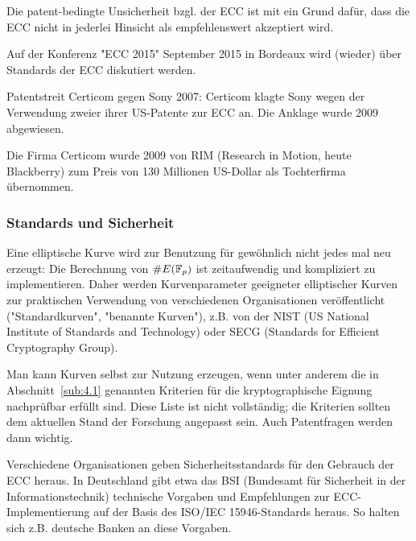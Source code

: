 \begin{bem}
	Die patent-bedingte Unsicherheit bzgl. der ECC ist mit ein Grund dafür, dass die ECC nicht in jederlei Hinsicht als empfehlenswert akzeptiert wird.
\end{bem}

\begin{bem}
	Auf der Konferenz "ECC 2015" September 2015 in Bordeaux wird (wieder) über Standards der ECC diskutiert werden.
\end{bem}

\begin{bem}
	Patentstreit Certicom gegen Sony 2007: Certicom klagte Sony wegen der Verwendung zweier ihrer US-Patente zur ECC an.
	Die Anklage wurde 2009 abgewiesen.
\end{bem}

\begin{bem}
	Die Firma Certicom wurde 2009 von RIM (Research in Motion, heute Blackberry) zum Preis von 130 Millionen US-Dollar als Tochterfirma übernommen.
\end{bem}

\subsubsection{Standards und Sicherheit}
\label{subsub:4.4.3}
\begin{bem}
	Eine elliptische Kurve wird zur Benutzung für gewöhnlich nicht jedes mal neu erzeugt: Die Berechnung von $\#E(\mathbb{F}_p)$ ist zeitaufwendig und kompliziert zu implementieren.
	Daher werden Kurvenparameter geeigneter elliptischer Kurven zur praktischen Verwendung von verschiedenen Organisationen veröffentlicht ("Standardkurven", "benannte Kurven"), z.B. von der NIST (US National Institute of Standards and Technology) oder SECG (Standards for Efficient Cryptography Group).
\end{bem}

\begin{bem}
	Man kann Kurven selbst zur Nutzung erzeugen, wenn unter anderem die in Abschnitt~\ref{sub:4.1} genannten Kriterien für die kryptographische Eignung nachprüfbar erfüllt sind.
	Diese Liste ist nicht vollständig; die Kriterien sollten dem aktuellen Stand der Forschung angepasst sein.
	Auch Patentfragen werden dann wichtig.
\end{bem}

\begin{bem}
	Verschiedene Organisationen geben Sicherheitsstandards für den Gebrauch der ECC heraus.
	In Deutschland gibt etwa das BSI (Bundesamt für Sicherheit in der Informationstechnik) technische Vorgaben und Empfehlungen zur ECC-Implementierung auf der Basis des ISO/IEC 15946-Standards heraus.
	So halten sich z.B. deutsche Banken an diese Vorgaben.
\end{bem}

